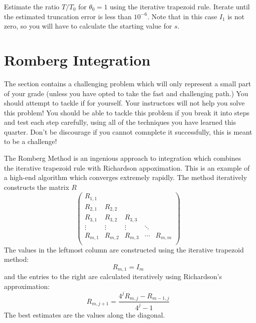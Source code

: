 \plot Estimate the ratio $T/T_0$ for $\theta_0=1$ using the iterative
trapezoid rule.  Iterate until the estimated truncation error is less
than $10^{-6}$.  Note that in this case $I_1$ is not zero, so you will
have to calculate the starting value for $s$.

\section{Romberg Integration}
\label{sec:romberg}

The section contains a challenging problem which will only represent a
small part of your grade (unless you have opted to take the fast and
challenging path.)  You should attempt to tackle if for yourself.
Your instructors will not help you solve this problem!  You should be
able to tackle this problem if you break it into steps and test each
step carefully, using all of the techniques you have learned this
quarter.  Don't be discourage if you cannot comnplete it successfully,
this is meant to be a challenge!

The Romberg Method is an ingenious approach to integration which
combines the iterative trapezoid rule with Richardson appoximation.
This is an example of a high-end algorithm which converges extremely
rapidly.  The method iteratively constructs the matrix $R$
\begin{displaymath}
\begin{pmatrix}
R_{1,1} &         &         &         & \\
R_{2,1} & R_{2,2} &         &         & \\
R_{3,1} & R_{3,2} & R_{3,3} &         & \\
\vdots  & \vdots  & \vdots  & \ddots  & \\
R_{m,1} & R_{m,2} & R_{m,3} & \cdots  & R_{m,m} \\
\end{pmatrix}
\end{displaymath}
The values in the leftmost column are constructed using the iterative trapezoid method:
\begin{displaymath}
R_{m,1} = I_m  
\end{displaymath}
and the entries to the right are calculated iteratively using Richardson's approximation:
\begin{displaymath}
R_{m,j+1} = \frac{4^j R_{m,j} - R_{m-1,j}}{4^j-1} 
\end{displaymath}
The best estimates are the values along the diagonal.

